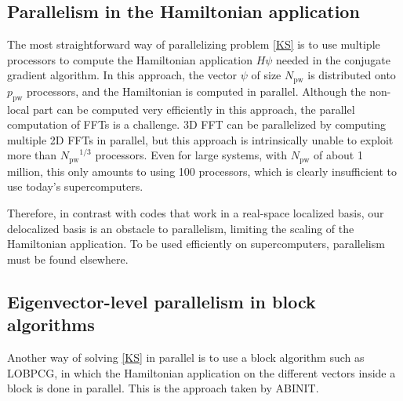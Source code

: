 \documentclass[11pt]{elsarticle}
\newcommand{\lela}{\left \langle}
\newcommand{\rira}{\right \rangle}
\newcommand{\npw}{\ensuremath{N_{\text{pw}}}\xspace}
\newcommand{\nband}{\ensuremath{N_{\text{bands}}}\xspace}
\newcommand{\nppw}{\ensuremath{p_{\text{pw}}}\xspace}
\begin{document}
\subsection{Parallelism in the Hamiltonian application}
The most straightforward way of parallelizing problem \eqref{KS} is to
use multiple processors to compute the Hamiltonian application $H
\psi$ needed in the conjugate gradient algorithm. In this approach,
the vector $\psi$ of size \npw is distributed onto \nppw processors,
and the Hamiltonian is computed in parallel. Although the non-local
part can be computed very efficiently in this approach, the parallel
computation of FFTs is a challenge. 3D FFT can be parallelized by
computing multiple 2D FFTs in parallel, but this approach is
intrinsically unable to exploit more than $\npw^{1/3}$
processors. Even for large systems, with $\npw$ of about 1 million,
this only amounts to using 100 processors, which is clearly
insufficient to use today's supercomputers.

Therefore, in contrast with codes that work in a real-space localized
basis, our delocalized basis is an obstacle to parallelism, limiting
the scaling of the Hamiltonian application. To be used efficiently on
supercomputers, parallelism must be found elsewhere.
\subsection{Eigenvector-level parallelism in block algorithms}
Another way of solving \eqref{KS} in parallel is to use a block
algorithm such as LOBPCG, in which the Hamiltonian application on the
different vectors inside a block is done in parallel. This is the
approach taken by ABINIT.

\end{document}
